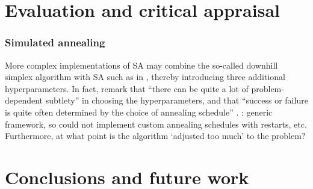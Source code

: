 \chapter{Evaluation and critical appraisal}

\subsection{Simulated annealing}
\label{sec:eval_sim_annealing}
More complex implementations of SA may combine the so-called downhill simplex algorithm \cite{nelder1965} with SA such as in \textcite[p. 444-455]{press1992}, thereby introducing three additional hyperparameters.
In fact, \citeauthor{press1992} remark that ``there can be quite a lot of problem-dependent subtlety'' in choosing the hyperparameters, and that ``success or failure is quite often determined by the choice of annealing schedule'' \cite*[p. 452]{press1992}.
\todo: generic framework, so could not implement custom annealing schedules with restarts, etc.
Furthermore, at what point is the algorithm `adjusted too much' to the problem?

\chapter{Conclusions and future work}
